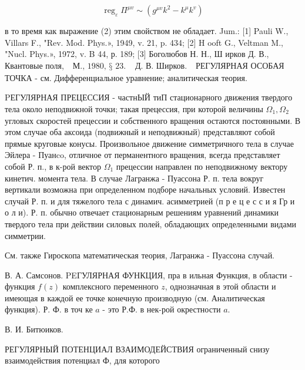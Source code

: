 \documentclass[10pt]{article}
\begin{document}
\[

\operatorname{reg}_{\varepsilon} \Pi^{\mu v} \sim\left(g^{\mu v} k^{2}-k^{\mu} k^{v}\right)

\]



в то время как выражение (2) этим свойством не обладает. Jum.: [1] Pauli W., Villars F., "Rev. Mod. Phys.», 1949, v. 21, p. 434; [2] H ooft G., Veltman M., "Nucl. Phys.», 1972, v. B 44, р. 189; [3] Боголюбов Н. Н., Ш ирков Д. В., Квантовые поля, $\begin{array}{ll}\text { М., 1980, § } 23 . & \text { Д. В. Ширков. }\end{array}$ РЕГУЛЯРНАЯ ОСОБАЯ ТОЧКА - см. Дифференциальное уравнение; аналитическая теория.



PЕГУЛЯРНАЯ ПРЕЦЕССИЯ - частнЫЙ тиП стационарного движения твердого тела около неподвижной точки; такая прецессия, при которой величины $\Omega_{1}, \Omega_{2}$ угловых скоростей прецессии и собственного вращения остаются постоянными. В этом случае оба аксоида (подвижный и неподвижный) представляют собой прямые круговые конусы. Произвольное движение симметричного тела в случае Эйлера - Пуанco, отличное от перманентного вращения, всегда представляет собой Р. п., в к-рой вектор $\Omega_{1}$ прецессии направлен по неподвижному вектору кинетич. момента тела. В случае Лагранжа - Пуассона Р. п. тела вокруг вертикали возможна при определенном подборе начальных условий. Известен случай Р. п. и для тяжелого тела с динамич. асимметрией (п р е ц е с с и я Гр и о л и). Р. п. обычно отвечает стационарным решениям уравнений динамики твердого тела при действии силовых полей, обладающих определенными видами симметрии.



См. также Гироскопа математическая теория, Лагранжа - Пуассона случай.



В. А. Самсонов. PEГУЛЯРНАЯ ФУНКЦИЯ, пра в ильная Функция, в области - функция $f(z)$ комплексного переменного $z$, однозначная в этой области и имеющая в каждой ее точке конечную производную (см. Аналитическая функция). Р. Ф. в точ ке $a$ - это Р.Ф. в нек-рой окрестности $a$.



В. И. Битюиков.



РЕГУЛЯРНЫЙ ПОТЕНЦИАЛ ВЗАИМОДЕЙСТВИЯ ограниченный снизу взаимодействия потенциал Ф, для которого
\end{document}
